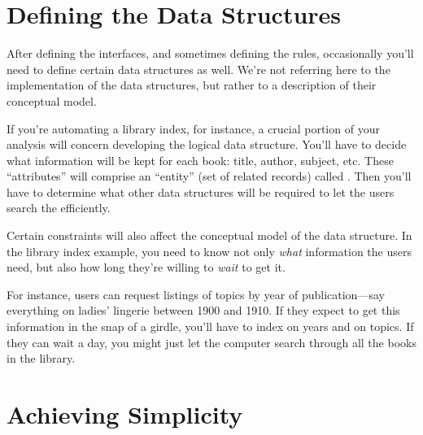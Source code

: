 \section{Defining the Data Structures}%
%
%
%
%

After defining the interfaces, and sometimes defining the rules,
occasionally you'll need to define certain data structures as well.
We're not referring here to the implementation of the data structures,
but rather to a description of their conceptual model.

If you're automating a library index, for instance, a crucial portion
of your analysis will concern developing the logical data structure.
You'll have to decide what information will be kept for each book:
title, author, subject, etc. These ``attributes'' will comprise an
``entity'' (set of related records) called . Then you'll
have to determine what other data structures will be required to let
the users search the  efficiently.





Certain constraints will also affect the conceptual model of the data
structure. In the library index example, you need to know not only
\emph{what} information the users need, but also how long they're
willing to \emph{wait} to get it.

For instance, users can request listings of topics by year of
publication---say everything on ladies' lingerie between 1900 and
1910.  If they expect to get this information in the snap of a girdle,
you'll have to index on years and on topics. If they can wait a day,
you might just let the computer search through all the books in the
library.%
%
%
%

\section{Achieving Simplicity}%
%

